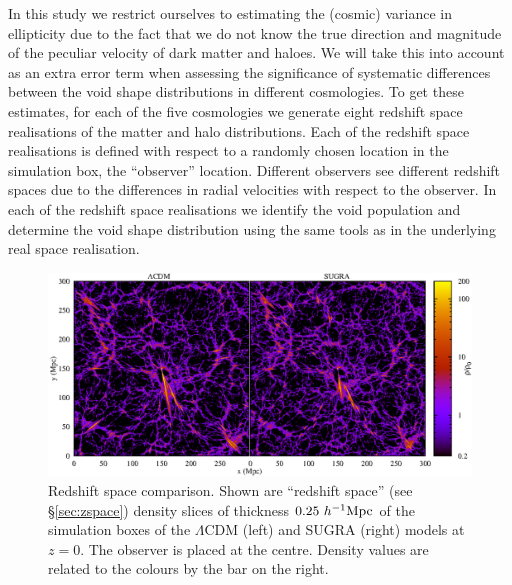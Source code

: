 In this study we restrict ourselves to estimating the (cosmic) variance in ellipticity due to the fact that we
do not know the true direction and magnitude of the peculiar velocity of dark matter and haloes.
We will 
take this into account as an extra error term when assessing the significance of systematic differences between 
the void shape distributions in different cosmologies. To get these estimates, for each of the five cosmologies we 
generate eight redshift space realisations of the matter and halo distributions. Each of the redshift space 
realisations is defined with respect to a randomly chosen location in the simulation box, the ``observer'' location. 
Different observers see different redshift spaces due to the differences in radial velocities with respect to the 
observer. In each of the redshift space realisations we identify the void population and determine the void shape 
distribution using the same tools as in the underlying real space realisation. 

\begin{figure}
\includegraphics[width=\textwidth]{ch_voidsde/img/model_comparison_z_paper}
\caption{Redshift space comparison. Shown are ``redshift space'' (see \S\ref{sec:zspace}) density slices of thickness $0.25~h^{-1} {\rm Mpc}$ of the simulation boxes of the $\Lambda$CDM (left) and SUGRA (right) models at $z=0$. The observer is placed at the centre. Density values are related to the colours by the bar on the right.}
\label{fig:model-comparison-z}
\end{figure}

